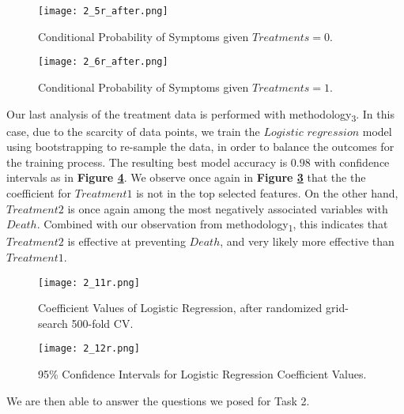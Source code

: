 \begin{figure}[H]
  \texttt{[image: 2\_5r\_after.png]}
  \caption{Conditional Probability of Symptoms given $Treatments = 0$.}
    \label{fig:2_5r_after}
\end{figure}
\begin{figure}[H]
  \texttt{[image: 2\_6r\_after.png]}
  \caption{Conditional Probability of Symptoms given $Treatments = 1$.}
    \label{fig:2_6r_after}
\end{figure}


Our last analysis of the treatment data is performed with methodology\textsubscript{3}. In this case, due to the scarcity of data points, we train the $Logistic$ $regression$ model using bootstrapping to re-sample the data, in order to balance the outcomes for the training process. The resulting best model accuracy is $0.98$ with confidence intervals as in \textbf{Figure \ref{fig:2_12r}}. We observe once again in \textbf{Figure \ref{fig:2_11r}} that the the coefficient for $Treatment1$ is not in the top selected features. On the other hand, $Treatment2$ is once again among the most negatively associated variables with $Death$. Combined with our observation from methodology\textsubscript{1}, this indicates that $Treatment2$ is effective at preventing $Death$, and very likely more effective than $Treatment1$.

\begin{figure}[H]
  \texttt{[image: 2\_11r.png]}
  \caption{Coefficient Values of Logistic Regression, after randomized grid-search 500-fold CV.}
    \label{fig:2_11r}
\end{figure}

\begin{figure}[H]
  \texttt{[image: 2\_12r.png]}
  \caption{95\%  Confidence  Intervals  for  Logistic  Regression Coefficient Values.}
    \label{fig:2_12r}
\end{figure}

We are then able to answer the questions we posed for Task 2.

